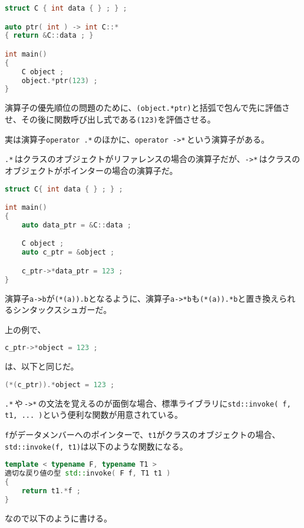 \begin{lstlisting}[language={C++}]
struct C { int data { } ; } ;

auto ptr( int ) -> int C::*
{ return &C::data ; }

int main()
{
    C object ;
    object.*ptr(123) ;
}
\end{lstlisting}

演算子の優先順位の問題のために、\texttt{(object.*ptr)}と括弧で包んで先に評価させ、その後に関数呼び出し式である\texttt{(123)}を評価させる。

実は演算子\texttt{operator .*}\,のほかに、\texttt{operator ->*}\,という演算子がある。

\texttt{.*}\,はクラスのオブジェクトがリファレンスの場合の演算子だが、\texttt{->*}\,はクラスのオブジェクトがポインターの場合の演算子だ。

\begin{lstlisting}[language={C++}]
struct C{ int data { } ; } ;

int main()
{
    auto data_ptr = &C::data ;

    C object ;
    auto c_ptr = &object ;

    c_ptr->*data_ptr = 123 ;
}
\end{lstlisting}

演算子\texttt{a->b}が\texttt{(*(a)).b}となるように、演算子\texttt{a->*b}も\texttt{(*(a)).*b}と置き換えられるシンタックスシュガーだ。

上の例で、
\begin{lstlisting}[language={C++}]
c_ptr->*object = 123 ;
\end{lstlisting}
は、以下と同じだ。

\begin{lstlisting}[language={C++}]
(*(c_ptr)).*object = 123 ;
\end{lstlisting}

\texttt{.*}\,や\,\texttt{->*}\,の文法を覚えるのが面倒な場合、標準ライブラリに\texttt{std::invoke( f, t1, ... )}という便利な関数が用意されている。

\texttt{f}がデータメンバーへのポインターで、\texttt{t1}がクラスのオブジェクトの場合、\texttt{std::invoke(f, t1)}は以下のような関数になる。

\begin{lstlisting}[language={C++}]
template < typename F, typename T1 >
適切な戻り値の型 std::invoke( F f, T1 t1 )
{
    return t1.*f ;
}
\end{lstlisting}

なので以下のように書ける。

